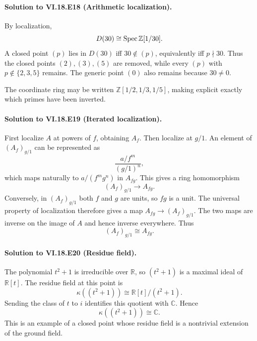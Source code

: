 \paragraph{Solution to VI.18.E18 (Arithmetic localization).}
\begin{solution}
By localization,
\[
D(30)\cong\operatorname{Spec}\mathbb Z[1/30].
\]
A closed point $(p)$ lies in $D(30)$ iff $30\notin(p)$, equivalently iff $p\nmid30$. Thus the closed points $(2),(3),(5)$ are removed, while every $(p)$ with $p\notin\{2,3,5\}$ remains. The generic point $(0)$ also remains because $30\neq0$.

The coordinate ring may be written $\mathbb Z[1/2,1/3,1/5]$, making explicit exactly which primes have been inverted.
\end{solution}

\paragraph{Solution to VI.18.E19 (Iterated localization).}
\begin{solution}
First localize $A$ at powers of $f$, obtaining $A_f$. Then localize at $g/1$. An element of $(A_f)_{g/1}$ can be represented as
\[
\frac{a/f^m}{(g/1)^n},
\]
which maps naturally to $a/(f^mg^n)$ in $A_{fg}$. This gives a ring homomorphism
\[
(A_f)_{g/1}\longrightarrow A_{fg}.
\]
Conversely, in $(A_f)_{g/1}$ both $f$ and $g$ are units, so $fg$ is a unit. The universal property of localization therefore gives a map $A_{fg}\to(A_f)_{g/1}$. The two maps are inverse on the image of $A$ and hence inverse everywhere. Thus
\[
(A_f)_{g/1}\cong A_{fg}.
\]
\end{solution}

\paragraph{Solution to VI.18.E20 (Residue field).}
\begin{solution}
The polynomial $t^2+1$ is irreducible over $\mathbb R$, so $(t^2+1)$ is a maximal ideal of $\mathbb R[t]$. The residue field at this point is
\[
\kappa((t^2+1))
\cong \mathbb R[t]/(t^2+1).
\]
Sending the class of $t$ to $i$ identifies this quotient with $\mathbb C$. Hence
\[
\boxed{\kappa((t^2+1))\cong\mathbb C.}
\]
This is an example of a closed point whose residue field is a nontrivial extension of the ground field.
\end{solution}

